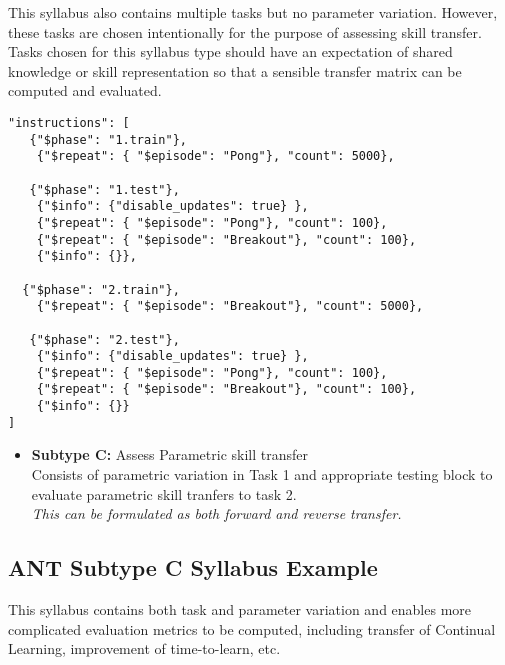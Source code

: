 This syllabus also contains multiple tasks but no parameter variation. However, these tasks are chosen intentionally for the purpose of assessing skill transfer. Tasks chosen for this syllabus type should have an expectation of shared knowledge or skill representation so that a sensible transfer matrix can be computed and evaluated.

\begin{small}
\begin{verbatim}
"instructions": [    
   {"$phase": "1.train"}, 
    {"$repeat": { "$episode": "Pong"}, "count": 5000}, 

   {"$phase": "1.test"},   
    {"$info": {"disable_updates": true} },
    {"$repeat": { "$episode": "Pong"}, "count": 100},  
    {"$repeat": { "$episode": "Breakout"}, "count": 100},  
    {"$info": {}},
   
  {"$phase": "2.train"},  
    {"$repeat": { "$episode": "Breakout"}, "count": 5000},

   {"$phase": "2.test"},   
    {"$info": {"disable_updates": true} },
    {"$repeat": { "$episode": "Pong"}, "count": 100},
    {"$repeat": { "$episode": "Breakout"}, "count": 100}, 
    {"$info": {}}
]

\end{verbatim}
\end{small}

\begin{itemize}            
    \item \textbf{Subtype C:} Assess Parametric skill transfer\\
        Consists of parametric variation in Task 1 and appropriate testing block to evaluate parametric skill tranfers to task 2.\\
        \textit{This can be formulated as both forward and reverse transfer.}\\
\end{itemize}

\subsection*{ANT Subtype C Syllabus Example}

This syllabus contains both task and parameter variation and enables more complicated evaluation metrics to be computed, including transfer of Continual Learning, improvement of time-to-learn, etc.

